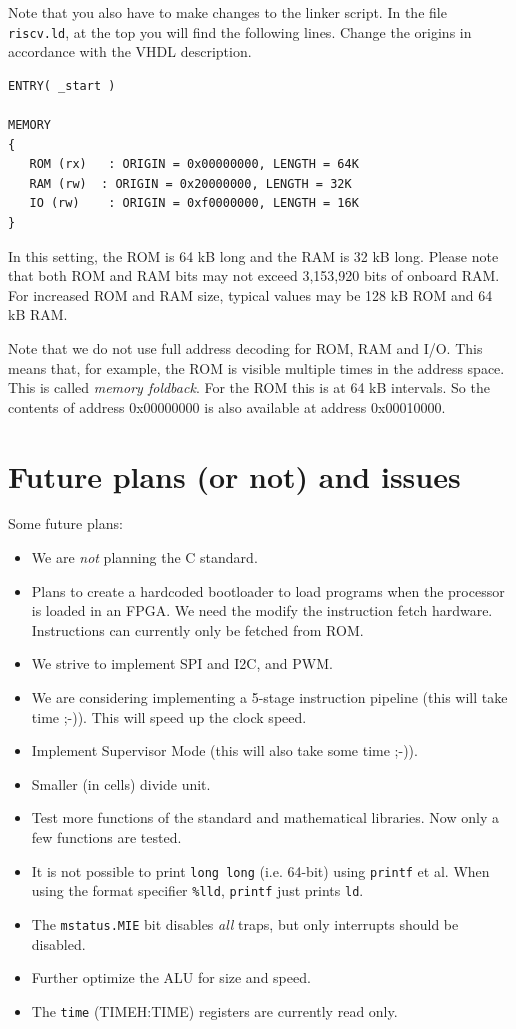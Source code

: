 \documentclass[12pt]{article}
\begin{document}
Note that you also have to make changes to the linker script. In the file \texttt{riscv.ld}, at the top you will find the following lines. Change the origins in accordance with the VHDL description.

\begin{lstlisting}
ENTRY( _start )

MEMORY
{
   ROM (rx)   : ORIGIN = 0x00000000, LENGTH = 64K
   RAM (rw)  : ORIGIN = 0x20000000, LENGTH = 32K
   IO (rw)    : ORIGIN = 0xf0000000, LENGTH = 16K
}
\end{lstlisting}

In this setting, the ROM is 64 kB long and the RAM is 32 kB long. Please note that both ROM and RAM bits may not exceed 3,153,920 bits of onboard RAM. For increased ROM and RAM size, typical values may be 128 kB ROM and 64 kB RAM.

Note that we do not use full address decoding for ROM, RAM and I/O. This means that, for example, the ROM is visible multiple times in the address space. This is called \emph{memory foldback}. For the ROM this is at 64 kB intervals. So the contents of address 0x00000000 is also available at address 0x00010000.

\section{Future plans (or not) and issues}
Some future plans:

\begin{itemize}
\item We are \emph{not} planning the C standard.
\item Plans to create a hardcoded bootloader to load programs when the processor is loaded in an FPGA. We need the modify the instruction fetch hardware. Instructions can currently only be fetched from ROM.
\item We strive to implement SPI and I2C, and PWM.
\item We are considering implementing a 5-stage instruction pipeline (this will take time ;-)). This will speed up the clock speed.
\item Implement Supervisor Mode (this will also take some time ;-)).
\item Smaller (in cells) divide unit.
\item Test more functions of the standard and mathematical libraries. Now only a few functions are tested.
\item It is not possible to print \texttt{long long} (i.e. 64-bit) using \texttt{printf} et al. When using the format specifier \texttt{\%lld}, \texttt{printf} just prints \texttt{ld}.
\item The \texttt{mstatus.MIE} bit disables \emph{all} traps, but only interrupts should be disabled.
\item Further optimize the ALU for size and speed.
\item The \texttt{time} (TIMEH:TIME) registers are currently read only.

\end{itemize}
\end{document}
